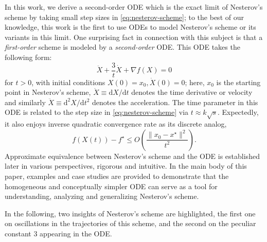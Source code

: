 \documentclass[twoside,11pt]{article}
\newcommand{\der}[1]{\dot #1}
\renewcommand{\d}{{\mathrm{d}}}
\begin{document}
In this work, we derive a second-order ODE which is the exact limit of
Nesterov's scheme by taking small step sizes in
\eqref{eq:nesterov-scheme}; to the best of our knowledge, this work is
the first to use ODEs to model Nesterov's scheme or its variants in
this limit.  One surprising fact in connection with this subject is
that a \textit{first-order} scheme is modeled by a
\textit{second-order} ODE.  This ODE takes the following form:
\begin{equation}\label{key}
\ddot{X} + \frac{3}{t}\dot{X} + \nabla f(X) = 0
\end{equation}
for $t > 0$, with initial conditions $X(0) = x_0, \der{X}(0) = 0$; here, $x_0$ is the starting point in Nesterov's scheme, $\dot X \equiv \d X/\d t$ denotes the time derivative or velocity and similarly $\ddot X \equiv \d^2 X/\d t^2$ denotes the acceleration. The time parameter in this ODE is related to the step size in \eqref{eq:nesterov-scheme} via $t \approx k\sqrt{s}$. Expectedly, it also enjoys inverse quadratic convergence rate as its discrete analog,
\[
f(X(t)) - f^\star \le O\left( \frac{\|x_0 - x^\star\|^2}{t^2}\right).
\]
Approximate equivalence between Nesterov's scheme and the ODE is established later in various perspectives, rigorous and intuitive. In the main body of this paper, examples and case studies are provided to demonstrate that the homogeneous and conceptually simpler ODE can serve as a tool for understanding, analyzing and generalizing Nesterov's scheme.

In the following, two insights of Nesterov's scheme are highlighted, the first one on oscillations in the trajectories of this scheme, and the second on the peculiar constant 3 appearing in the ODE.
\end{document}
